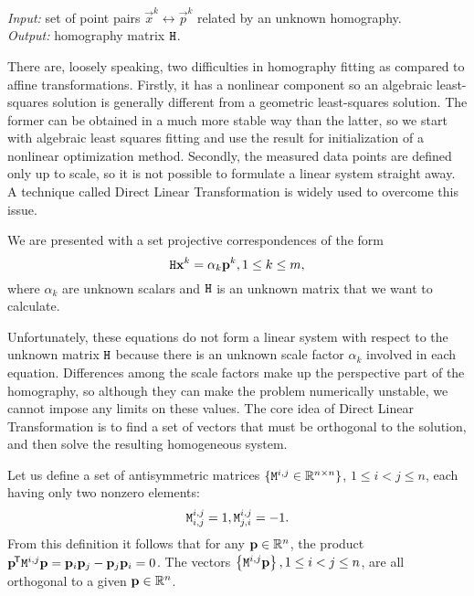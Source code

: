 \textit{Input:} set of point pairs $\vec x^k \leftrightarrow \vec p^k$ related by an unknown homography.\\
\textit{Output:} homography matrix $\mathtt{H}$.\\


There are, loosely speaking, two difficulties in homography fitting as compared to affine transformations.
Firstly, it has a nonlinear component so an algebraic least-squares solution is generally different from a geometric least-squares solution.
The former can be obtained in a much more stable way than the latter, so we start with algebraic least squares fitting and use the result for initialization of a nonlinear optimization method.
Secondly, the measured data points are defined only up to scale, so it is not possible to formulate a linear system straight away.
A technique called Direct Linear Transformation is widely used to overcome this issue.

We are presented with a set projective correspondences of the form
$$\mathtt{H} \mathbf{x}^k = \alpha_k \mathbf{p}^k, 1 \leq k \leq m,$$
where $\alpha_k$ are unknown scalars and $\mathtt{H}$ is an unknown matrix that we want to calculate.

Unfortunately, these equations do not form a linear system with respect to the unknown matrix $\mathtt{H}$ because there is an unknown scale factor $\alpha_k$ involved in each equation.
Differences among the scale factors make up the perspective part of the homography, so although they can make the problem numerically unstable, we cannot impose any limits on these values.
The core idea of Direct Linear Transformation is to find a set of vectors that must be orthogonal to the solution, and then solve the resulting homogeneous system.

Let us define a set of antisymmetric matrices $\{\mathtt{M}^{i, j} \in \mathbb{R}^{n \times n}\}$, $1 \leq i < j \leq n$, each having only two nonzero elements:
$$\mathtt{M}^{i, j}_{i, j} = 1,
\mathtt{M}^{i, j}_{j, i} = -1.$$
From this definition it follows that for any $\mathbf{p} \in \mathbb{R}^n$, the product $\mathbf{p}^{\!\mathsf{T}} \mathtt{M}^{i, j} \mathbf{p} = \mathbf{p}_{i} \mathbf{p}_{j} - \mathbf{p}_{j} \mathbf{p}_{i} = 0$.
The vectors $\left\{ \mathtt{M}^{i, j} \mathbf{p} \right\}, 1 \leq i < j \leq n$, are all orthogonal to a given $\mathbf{p} \in \mathbb{R}^n$.


